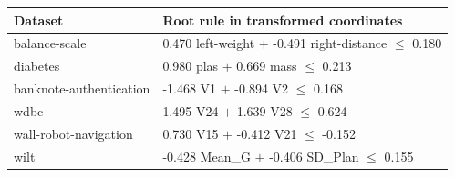 \begin{tabular}{lp{}}
\toprule
Dataset & Root rule in transformed coordinates \\
\midrule
balance-scale & \parbox[t]{0.61\textwidth}{0.470 left-weight $+$ -0.491 right-distance $\leq$ 0.180} \\
diabetes & \parbox[t]{0.61\textwidth}{0.980 plas $+$ 0.669 mass $\leq$ 0.213} \\
banknote-authentication & \parbox[t]{0.61\textwidth}{-1.468 V1 $+$ -0.894 V2 $\leq$ 0.168} \\
wdbc & \parbox[t]{0.61\textwidth}{1.495 V24 $+$ 1.639 V28 $\leq$ 0.624} \\
wall-robot-navigation & \parbox[t]{0.61\textwidth}{0.730 V15 $+$ -0.412 V21 $\leq$ -0.152} \\
wilt & \parbox[t]{0.61\textwidth}{-0.428 Mean\_G $+$ -0.406 SD\_Plan $\leq$ 0.155} \\
\bottomrule
\end{tabular}
